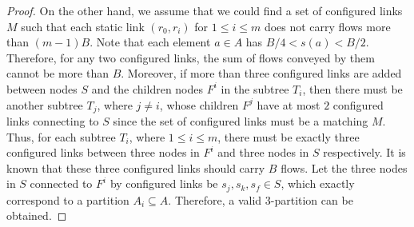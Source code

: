 \documentclass[sigconf]{acmart}
\begin{document}
\begin{proof}
On the other hand, we assume that we could find a set of configured links $M$ such that each static link $(r_0,r_i)$ for $1\leq i\leq m$ does not carry flows more than $(m-1)B$. Note that each element $a\in A$ has $B/4< s(a)< B/2$.  Therefore, for any two configured links, the sum of flows conveyed by them cannot be more than $B$. Moreover, if more than three configured links are added  between nodes $S$ and  the children nodes $F^i$ in the subtree $T_i$, then there must be another subtree $T_j$, where $j\neq i$, whose children $F^j$ have at most $2$ configured links connecting to $S$ since the set of configured links must be a matching $M$. Thus, for each subtree $T_i$, where $1\leq i\leq m$, there must be exactly three configured links between three nodes in $F^i$ and three nodes in $S$ respectively. It is known that these three configured links should carry $B$ flows. Let the three nodes in $S$ connected to $F^i$ by configured links be $s_j,s_k,s_f\in S$, which exactly correspond to a partition $A_i\subseteq A$. Therefore, a valid $3$-partition can be obtained.
\end{proof}
\end{document}
